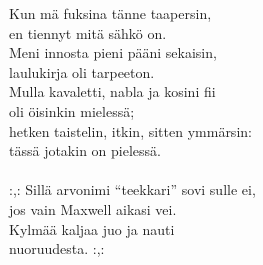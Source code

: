 
            Kun mä fuksina tänne taapersin, \\
            en tiennyt mitä sähkö on. \\
            Meni innosta pieni pääni sekaisin, \\
            laulukirja oli tarpeeton. \\
            Mulla kavaletti, nabla ja kosini fii \\
            oli öisinkin mielessä; \\
            hetken taistelin, itkin, sitten ymmärsin: \\
            tässä jotakin on pielessä. \\
\hspace{10mm} \\
            :,: Sillä arvonimi “teekkari” sovi sulle ei, \\
            jos vain Maxwell aikasi vei. \\
            Kylmää kaljaa juo ja nauti \\
            nuoruudesta. :,: \\
\hspace{10mm} \\
